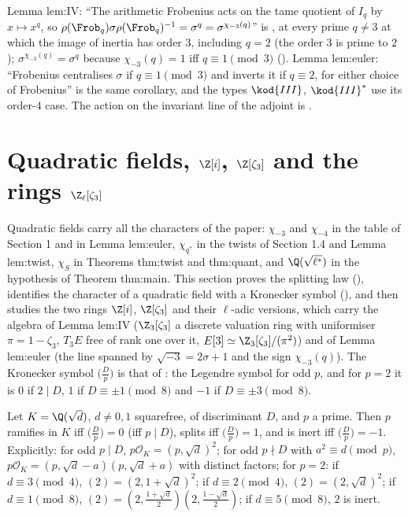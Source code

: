 \begin{paperlink}\label{pl:ant:frobsigma}
Lemma lem:IV: ``The arithmetic Frobenius acts on the tame quotient of $I_q$ by $x\mapsto x^q$, so $\rho(\Frob_q)\sigma\rho(\Frob_q)^{-1}=\sigma^q=
\sigma^{\chi_{-3}(q)}$'' is , at every prime $q\ne3$ at which the image of inertia has order $3$, including $q=2$ (the order $3$ is
prime to $2$); $\sigma^{\chi_{-3}(q)}=\sigma^q$ because $\chi_{-3}(q)=1$ iff $q\equiv1\pmod3$ (). Lemma lem:euler: ``Frobenius
centralises $\sigma$ if $q\equiv1\pmod3$ and inverts it if $q\equiv2$, for either choice of Frobenius'' is the same corollary, and the types
$\kod{III}$, $\kod{III}^*$ use its order-$4$ case. The action on the invariant line of the adjoint is .
\end{paperlink}

\section{Quadratic fields, \texorpdfstring{$\Z[i]$}{Z[i]}, \texorpdfstring{$\Z[\zeta_3]$}{Z[zeta3]} and the rings \texorpdfstring{$\Z_\ell[\zeta_3]$}{Zl[zeta3]}}\label{sec:ant:quadratic}

Quadratic fields carry all the characters of the paper: $\chi_{-3}$ and $\chi_{-4}$ in the table of Section 1 and in Lemma lem:euler,
$\chi_{q^*}$ in the twists of Section 1.4 and Lemma lem:twist, $\chi_S$ in Theorems thm:twist and thm:quant, and $\Q(\sqrt{\ell^*})$ in the hypothesis
of Theorem thm:main. This section proves the splitting law (), identifies the character of a quadratic field with a
Kronecker symbol (), and then studies the two rings $\Z[i]$, $\Z[\zeta_3]$ and their $\ell$-adic versions, which carry the
algebra of Lemma lem:IV ($\Z_3[\zeta_3]$ a discrete valuation ring with uniformiser $\pi=1-\zeta_3$, $T_3E$ free of rank one over it,
$E[3]\simeq\Z_3[\zeta_3]/(\pi^2)$) and of Lemma lem:euler (the line spanned by $\sqrt{-3}=2\sigma+1$ and the sign $\chi_{-3}(q)$). The Kronecker symbol
$\bigl(\frac Dp\bigr)$ is that of : the Legendre symbol for odd $p$, and for $p=2$ it is $0$ if $2\mid D$, $1$ if $D\equiv\pm1\pmod8$ and $-1$ if
$D\equiv\pm3\pmod8$.

\begin{theorem}\label{thm:ant:quadsplit}
Let $K=\Q(\sqrt d)$, $d\ne0,1$ squarefree, of discriminant $D$, and $p$ a prime. Then $p$ ramifies in $K$ iff $\bigl(\frac Dp\bigr)=0$ (iff $p\mid D$), splits
iff $\bigl(\frac Dp\bigr)=1$, and is inert iff $\bigl(\frac Dp\bigr)=-1$. Explicitly: for odd $p\mid D$, $p\mathcal O_K=(p,\sqrt d)^2$; for odd $p\nmid D$ with
$a^2\equiv d\pmod p$, $p\mathcal O_K=(p,\sqrt d-a)(p,\sqrt d+a)$ with distinct factors; for $p=2$: if $d\equiv3\pmod4$, $(2)=(2,1+\sqrt d)^2$; if
$d\equiv2\pmod4$, $(2)=(2,\sqrt d)^2$; if $d\equiv1\pmod8$, $(2)=(2,\frac{1+\sqrt d}2)(2,\frac{1-\sqrt d}2)$; if $d\equiv5\pmod8$, $2$ is inert.
\end{theorem}

